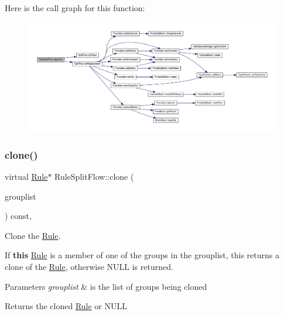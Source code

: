 Here is the call graph for this function\+:
\nopagebreak
\begin{figure}[H]
\begin{center}
\leavevmode
\includegraphics[width=350pt]{class_rule_split_flow_a7d4caa289d33f6ee12571bbc4abdc91d_cgraph}
\end{center}
\end{figure}
\mbox{\label{class_rule_split_flow_a2eb007bc2f4ef7c6c11c0bfb15896c7a}} 
\subsubsection{\texorpdfstring{clone()}{clone()}}
{\footnotesize\ttfamily virtual \mbox{\hyperlink{class_rule}{Rule}}$\ast$ Rule\+Split\+Flow\+::clone (\begin{DoxyParamCaption}\item[{const \mbox{\hyperlink{class_action_group_list}{Action\+Group\+List}} \&}]{grouplist }\end{DoxyParamCaption}) const\hspace{0.3cm}{\ttfamily [inline]}, {\ttfamily [virtual]}}



Clone the \mbox{\hyperlink{class_rule}{Rule}}. 

If {\bfseries{this}} \mbox{\hyperlink{class_rule}{Rule}} is a member of one of the groups in the grouplist, this returns a clone of the \mbox{\hyperlink{class_rule}{Rule}}, otherwise N\+U\+LL is returned. 
\begin{DoxyParams}{Parameters}
{\em grouplist} & is the list of groups being cloned \\
\hline
\end{DoxyParams}
\begin{DoxyReturn}{Returns}
the cloned \mbox{\hyperlink{class_rule}{Rule}} or N\+U\+LL 
\end{DoxyReturn}


